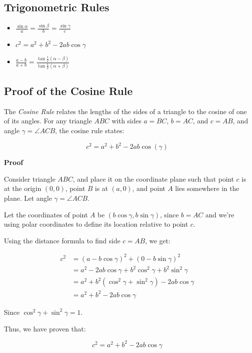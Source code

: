 \subsection{Trigonometric Rules}

\begin{itemize}

    \item \(\frac{\sin \alpha}{a} = \frac{\sin \beta}{b} = \frac{\sin \gamma}{c}\)

    \item \(c^2 = a^2 + b^2 - 2ab \cos \gamma\)

    \item \(\frac{a - b}{a + b} = \frac{\tan \frac{1}{2}(\alpha - \beta)}{\tan \frac{1}{2} (\alpha + \beta)}\)

\end{itemize}

\subsection{Proof of the Cosine Rule}

The \emph{Cosine Rule} relates the lengths of the sides of a triangle to the cosine of one of its angles. 
For any triangle \( ABC \) with sides \( a = BC \), \( b = AC \), and \( c = AB \), and angle 
\( \gamma = \angle ACB \), the cosine rule states:

\[
    c^2 = a^2 + b^2 - 2ab\cos(\gamma)
\]

\textbf{Proof}

Consider triangle \( ABC \), and place it on the coordinate plane such that point \(c\) is at the origin
\( (0,0) \), point \(B\) is at \( (a,0) \), and point \(A\) lies somewhere in the plane. 
Let angle \( \gamma = \angle ACB \).

Let the coordinates of point \(A\) be \( (b\cos\gamma, b\sin\gamma) \), since \( b = AC \) and we’re 
using polar coordinates to define its location relative to point \(c\).

Using the distance formula to find side \( c = AB \), we get:

\begin{align*}
    c^2 &= {(a - b\cos\gamma)}^2 + {(0 - b\sin\gamma)}^2 \\
    &= a^2 - 2ab\cos\gamma + b^2\cos^2\gamma + b^2\sin^2\gamma \\
    &= a^2 + b^2(\cos^2\gamma + \sin^2\gamma) - 2ab\cos\gamma \\
    &= a^2 + b^2 - 2ab\cos\gamma
\end{align*}

Since \( \cos^2\gamma + \sin^2\gamma = 1 \).

Thus, we have proven that:

\[
    c^2 = a^2 + b^2 - 2ab\cos\gamma
\]

\QED